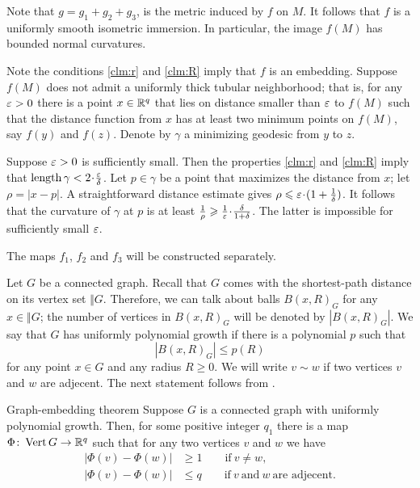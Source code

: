 \documentclass[a4paper,10pt]{article}
\begin{document}
Note that $g=g_1+g_2+g_3$, is the metric induced by $f$ on $M$.
It follows that $f$ is a uniformly smooth isometric immersion.
In particular, the image $f(M)$ has bounded normal curvatures.

Note the conditions \ref{clm:r} and \ref{clm:R} imply that $f$ is an embedding.
Suppose $f(M)$ does not admit a uniformly thick tubular neighborhood;
that is, for any $\varepsilon>0$ there is a point $x\in \mathbb{R}^q$ that lies on distance smaller than $\varepsilon$ to $f(M)$ such that the distance function from $x$ has at least two minimum points on $f(M)$,
say $f(y)$ and $f(z)$.
Denote by $\gamma$ a minimizing geodesic from $y$ to $z$.

Suppose $\varepsilon>0$ is sufficiently small.
Then the properties \ref{clm:r} and \ref{clm:R} imply that $\length\gamma<2\cdot\tfrac\eps\delta$.
Let $p\in\gamma$ be a point that maximizes the distance from $x$; let $\rho=|x-p|$.
A straightforward distance estimate gives $\rho\le \eps\cdot(1+\tfrac1\delta)$.
It follows that the curvature of $\gamma$ at $p$ is at least $\tfrac1\rho\ge \tfrac1\eps\cdot \tfrac\delta{1+\delta}$.
The latter is impossible for sufficiently small $\varepsilon$.
\qeds

The maps $f_1$, $f_2$ and $f_3$ will be constructed separately.



Let $G$ be a connected graph.
Recall that $G$ comes with the shortest-path distance on its vertex set $\Vert G$.
Therefore, we can talk about balls $B(x,R)_G$ for any $x\in \Vert G$;
the number of vertices in $B(x,R)_G$ will be denoted by $|B(x,R)_G|$.
We say that $G$ has uniformly polynomial growth if there is a polynomial $p$ such that 
\[|B(x,R)_G|\le p(R)\]
for any point $x\in G$ and any radius $R\ge 0$.
We will write $v\sim w$ if two vertices $v$ and $w$ are adjecent. 
The next statement follows from \cite[Theorem 5.5]{krauthgamer-lee1}.

\begin{thm}{Graph-embedding theorem}
Suppose $G$ is a connected graph with uniformly polynomial growth.
Then, for some positive integer $q_1$ there is a map $\Phi\colon\mathop{\rm Vert} G\to \mathbb{R}^q$ such that
for any two vertices $v$ and $w$ we have
\begin{align*}
|\Phi(v)-\Phi(w)|&\ge1\qquad\text{if}\ v\ne w,
\\
|\Phi(v)-\Phi(w)|&\le q\qquad\text{if}\ v\ \text{and}\ w\ \text{are adjecent}.
\end{align*}

\end{thm}
\end{document}
